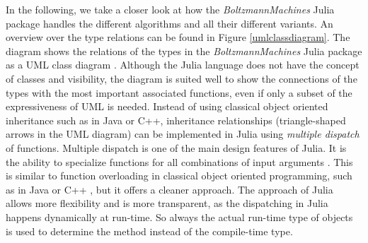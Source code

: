 \documentclass[12pt]{article}
\newcommand{\apkg}[1]{\emph{#1}}
\begin{document}
In the following, we take a closer look at how the \apkg{BoltzmannMachines} Julia package handles the different algorithms and all their different variants.
An overview over the type relations can be found in Figure \ref{umlclassdiagram}.
The diagram shows the relations of the types in the \apkg{BoltzmannMachines} Julia package as a UML class diagram \citep{uml}.
Although the Julia language does not have the concept of classes and visibility, the diagram is suited well to show the connections of the types with the most important associated functions, even if only a subset of the expressiveness of UML is needed.
Instead of using classical object oriented inheritance such as in Java or C++, inheritance relationships (triangle-shaped arrows in the UML diagram) can be implemented in Julia using {\em multiple dispatch} of functions.
Multiple dispatch is one of the main design features of Julia.
It is the ability to specialize functions for all combinations of input arguments \citep{zappa_nardelli_julia_2018}.
This is similar to function overloading in classical object oriented programming, such as in Java \citep{arnold2005java} or C++ \citep{cppstandard}, but it offers a cleaner approach.
The approach of Julia allows more flexibility and is more transparent, as the dispatching in Julia happens dynamically at run-time.
So always the actual run-time type of objects is used to determine the method instead of the compile-time type.
\end{document}
